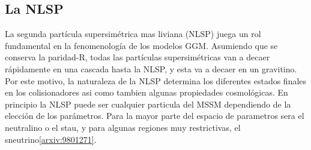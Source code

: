 






\subsection{La NLSP}

La segunda partícula supersimétrica mas liviana (NLSP) juega un rol
fundamental en la fenomenología de los modelos GGM. Asumiendo que se
conserva la paridad-R, todas las partículas supersimétricas van a
decaer rápidamente en una cascada hasta la NLSP, y esta va a decaer en
un gravitino.
Por este motivo, la naturaleza de la NLSP determina los diferentes estados finales en los colisionadores
asi como tambien algunas propiedades cosmológicas. En principio
la NLSP puede ser cualquier particula del MSSM dependiendo de
la elección de los parámetros. Para la mayor parte del espacio de
parametros sera el neutralino o el stau, y para algunas
regiones muy restrictivas, el
sneutrino\ref{arxiv:9801271}.




